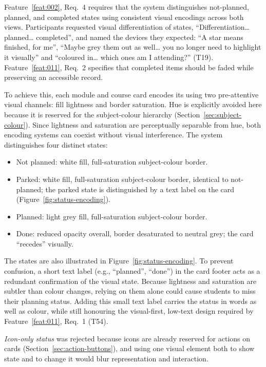 Feature~\ref{feat:002}, Req.~4 requires that the system distinguishes not-planned, planned, and completed states using consistent visual encodings across both views. Participants requested visual differentiation of states, \enquote{Differentiation… planned… completed}, and named the devices they expected: \enquote{A star means finished, for me}, \enquote{Maybe grey them out as well… you no longer need to highlight it visually} and \enquote{coloured in… which ones am I attending?} (T19). Feature~\ref{feat:011}, Req.~2 specifies that completed items should be faded while preserving an accessible record.

To achieve this, each module and course card encodes its  using two pre-attentive visual channels: fill lightness and border saturation. Hue is explicitly avoided here because it is reserved for the subject-colour hierarchy (Section~\ref{sec:subject-colour}). Since lightness and saturation are perceptually separable from hue, both encoding systems can coexist without visual interference. The system distinguishes four distinct states:

\begin{itemize}
  \item Not planned: white fill, full-saturation subject-colour border.
  \item Parked: white fill, full-saturation subject-colour border, identical to not-planned; the parked state is distinguished by a text label on the card (Figure~\ref{fig:status-encoding}).
  \item Planned: light grey fill, full-saturation subject-colour border.
  \item Done: reduced opacity overall, border desaturated to neutral grey; the card \enquote{recedes} visually.
\end{itemize}
The states are also illustrated in Figure~\ref{fig:status-encoding}. To prevent confusion, a short text label (e.g., \enquote{planned}, \enquote{done}) in the card footer acts as a redundant confirmation of the visual state. Because lightness and saturation are subtler than colour changes, relying on them alone could cause students to miss their planning status. Adding this small text label carries the status in words as well as colour, while still honouring the visual-first, low-text design required by Feature~\ref{feat:011}, Req.~1 (T54).

\emph{Icon-only status} was rejected because icons are already reserved for actions on cards (Section~\ref{sec:action-buttons}), and using one visual element both to show state and to change it would blur representation and interaction.

